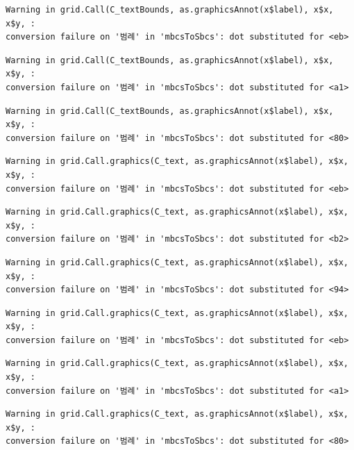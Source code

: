 \documentclass[
  letterpaper,
  DIV=11,
  numbers=noendperiod]{scrreprt}
\begin{document}
\begin{verbatim}
Warning in grid.Call(C_textBounds, as.graphicsAnnot(x$label), x$x, x$y, :
conversion failure on '범례' in 'mbcsToSbcs': dot substituted for <eb>
\end{verbatim}

\begin{verbatim}
Warning in grid.Call(C_textBounds, as.graphicsAnnot(x$label), x$x, x$y, :
conversion failure on '범례' in 'mbcsToSbcs': dot substituted for <a1>
\end{verbatim}

\begin{verbatim}
Warning in grid.Call(C_textBounds, as.graphicsAnnot(x$label), x$x, x$y, :
conversion failure on '범례' in 'mbcsToSbcs': dot substituted for <80>
\end{verbatim}

\begin{verbatim}
Warning in grid.Call.graphics(C_text, as.graphicsAnnot(x$label), x$x, x$y, :
conversion failure on '범례' in 'mbcsToSbcs': dot substituted for <eb>
\end{verbatim}

\begin{verbatim}
Warning in grid.Call.graphics(C_text, as.graphicsAnnot(x$label), x$x, x$y, :
conversion failure on '범례' in 'mbcsToSbcs': dot substituted for <b2>
\end{verbatim}

\begin{verbatim}
Warning in grid.Call.graphics(C_text, as.graphicsAnnot(x$label), x$x, x$y, :
conversion failure on '범례' in 'mbcsToSbcs': dot substituted for <94>
\end{verbatim}

\begin{verbatim}
Warning in grid.Call.graphics(C_text, as.graphicsAnnot(x$label), x$x, x$y, :
conversion failure on '범례' in 'mbcsToSbcs': dot substituted for <eb>
\end{verbatim}

\begin{verbatim}
Warning in grid.Call.graphics(C_text, as.graphicsAnnot(x$label), x$x, x$y, :
conversion failure on '범례' in 'mbcsToSbcs': dot substituted for <a1>
\end{verbatim}

\begin{verbatim}
Warning in grid.Call.graphics(C_text, as.graphicsAnnot(x$label), x$x, x$y, :
conversion failure on '범례' in 'mbcsToSbcs': dot substituted for <80>
\end{verbatim}
\end{document}
